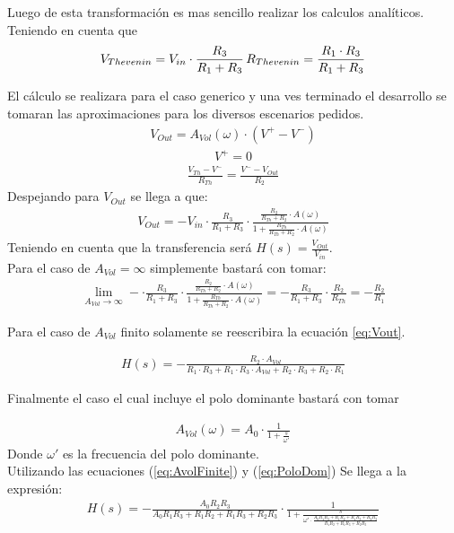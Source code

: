 Luego de esta transformación es mas sencillo realizar los calculos analíticos.
Teniendo en cuenta que 
\begin{align}V_{Thevenin} = V_{in} \cdot \frac{R_3}{R_1+R_3}  \thinspace  R_{Thevenin} = \frac{R_1\cdot R_3}{R_1+R_3}
\label{eq:thev}
\end{align} 

El cálculo se realizara para el caso generico y una ves terminado el desarrollo se tomaran las aproximaciones para los diversos escenarios pedidos.
\begin{align}
V_{Out}= A_{Vol}(\omega) \cdot (V^+ - V^-)
\end{align}
\begin{align}
V^+=0\end{align}
\begin{align}\frac{V_{Th}-V^-}{R_{Th}}=\frac{V^--V_{Out}}{R_2}
\label{eq:nodeInv}
\end{align}
Despejando para $V_{Out}$ se llega a que:
\begin{align}
\label{eq:Vout}
V_{Out}=-V_{in} \cdot \frac{R_3}{R_1+R_3} \cdot \frac{\frac{R_2}{R_{Th}+R_2}\cdot A(\omega)}{1+\frac{R_{Th}}{R_{Th}+R_2}\cdot A(\omega)}
\end{align}
Teniendo en cuenta que la transferencia será $ H(s)=\frac{V_{Out}}{V_{in}}$.\\
Para el caso de $A_{Vol}=\infty$ simplemente bastará con tomar:
\begin{align}\lim_{A_{Vol}\to\infty} - \cdot \frac{R_3}{R_1+R_3} \cdot \frac{\frac{R_2}{R_{Th}+R_2}\cdot A(\omega)}{1+\frac{R_{Th}}{R_{Th}+R_2}\cdot A(\omega)} = -\frac{R_3}{R_1+R_3}\cdot\frac{R_2}{R_{Th}}=-\frac{R_2}{R_1}\end{align}

Para el caso de $A_{Vol}$ finito solamente se reescribira la ecuación \ref{eq:Vout}.

\begin{align}
H(s)= -\frac{R_2\cdot A_{Vol}}{R_1\cdot R_3+R_1\cdot R_3 \cdot A_{Vol} +R_2\cdot R_3+R_2\cdot R_1}
\label{eq:AvolFinite}
\end{align}

Finalmente el caso el cual incluye el polo dominante bastará con tomar 

\begin{align}A_{Vol}(\omega)=A_0 \cdot \frac{1}{1+\frac{s}{\omega'}}
\label{eq:PoloDom}
\end{align}
Donde $\omega'$ es la frecuencia del polo dominante.\\
Utilizando las ecuaciones (\ref{eq:AvolFinite}) y (\ref{eq:PoloDom})
Se llega a la expresión:
\begin{align}
\label{eq:polodom}
H(s)=-\frac{A_0R_2R_3}{A_0R_1R_3+R_1R_2+R_1R_3+R_2R_3} \cdot\frac{1}{1+\frac{s}{\omega' \cdot \frac{A_0R_1R_3+R_1R_2+R_1R_3+R_2R_3}{R_1R_2+R_1R_3+R_2R_3}}}
\end{align}

